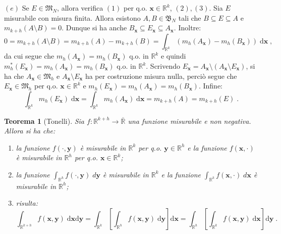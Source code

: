 \documentclass[a4paper,12pt]{report}
\theoremstyle{plain}
\newtheorem{thm}{Teorema}[section]
\theoremstyle{definition}
\theoremstyle{remark}
\newcommand{\diff}[1]{\mathrm{d}#1}
\numberwithin{equation}{section}
\begin{document}
$(e)$ Se $E\in\mathfrak{M}_N$, allora verifica $(1)$ per q.o. $\mathbf{x}\in\mathbb{R}^k$, $(2),(3)$. Sia $E$ misurabile con misura 
finita. Allora esistono $A,B\in\mathfrak{B}_N$ tali che $B\subseteq E\subseteq A$ e $m_{k+h}(A\setminus B)=0$. Dunque si ha anche $B_
{\mathbf{x}}\subseteq E_{\mathbf{x}}\subseteq A_{\mathbf{x}}$. Inoltre:
\begin{equation}
0=m_{k+h}(A\setminus B)=m_{k+h}(A)-m_{k+h}(B)=\int_{\mathbb{R}^k} (m_h(A_{\mathbf{x}})-m_h(B_{\mathbf{x}}))\;\diff{\mathbf{x}}\;,
\end{equation}
da cui segue che $m_h(A_{\mathbf{x}})=m_h(B_{\mathbf{x}})$ q.o. in $\mathbb{R}^k$ e quindi $m_h^*(E_{\mathbf{x}})=m_h(A_{\mathbf{x}})=m_h(B_{\mathbf{x}})$ q.o. in $\mathbb{R}^k$. Scrivendo $E_{\mathbf{x}}=A_{\mathbf{x}}\setminus (A_{\mathbf{x}}\setminus E_{\mathbf{x}})$, si ha che $A_{\mathbf{x}}\in\mathfrak{M}_h$ e $A_{\mathbf{x}}\setminus E_{\mathbf{x}}$ ha per costruzione misura nulla, perciò segue che $E_{\mathbf{x}}\in\mathfrak{M}_h$ per q.o. $\mathbf{x}\in\mathbb{R}^k$ e $m_h(E_{\mathbf{x}})=m_h(A_{\mathbf{x}})=m_h(B_{\mathbf{x}})$. Infine:
\begin{equation}
\int_{\mathbb{R}^k} m_h(E_{\mathbf{x}})\;\diff{\mathbf{x}}=\int_{\mathbb{R}^k}m_h(A_{\mathbf{x}})\;\diff{\mathbf{x}}=m_{k+h}(A)=m_{k+h}(E)\;.
\end{equation}
\endproof
\begin{thm}[Tonelli] Sia $f:\mathbb{R}^{k+h}\to\overline{\mathbb{R}}$ una funzione misurabile e non negativa. Allora si ha che:
\begin{enumerate}
 \item la funzione $f(\cdot,\mathbf{y})$ è misurabile in $\mathbb{R}^k$ per q.o. $\mathbf{y}\in\mathbb{R}^h$ e la funzione $f(\mathbf{x},
\cdot)$ è misurabile in $\mathbb{R}^h$ per q.o. $\mathbf{x}\in\mathbb{R}^k$;
\item la funzione $\int_{\mathbb{R}^h} f(\cdot,\mathbf{y})\;d\mathbf{y}$ è misurabile in $\mathbb{R}^k$ e la funzione $\int_{\mathbb{R}^k} f(\mathbf{x},\cdot)\;d\mathbf{x}$ è misurabile in $\mathbb{R}^h$;
\item risulta:
\begin{equation}
\int_{\mathbb{R}^{k+h}}f(\mathbf{x},\mathbf{y})\;\diff{\mathbf{x}}\diff{\mathbf{y}}=\int_{\mathbb{R}^k}\left[\int_{\mathbb{R}^h} f(\mathbf{x},\mathbf{y})\;\diff{\mathbf{y}}\right]\diff{\mathbf{x}}=\int_{\mathbb{R}^h}\left[\int_{\mathbb{R}^k} f(\mathbf{x},\mathbf{y})\;\diff{\mathbf{x}}\right]\diff{\mathbf{y}}\;.
\end{equation}
\end{enumerate}
\end{thm}
\end{document}
